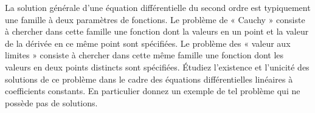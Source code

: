 
\begin{exercice}\label{exoEqsDiff0009}

La solution générale d'une équation différentielle du second ordre 
est typiquement une famille à deux paramètres de fonctions. Le 
problème de « Cauchy » consiste à chercher dans cette famille une 
fonction dont la valeurs en un point et la valeur de la dérivée en ce 
même point sont spécifiées. Le problème des « valeur aux limites »
consiste à chercher dans cette même famille une fonction dont les 
valeurs en deux points distincts sont spécifiées. Étudiez l'existence 
et l'unicité des solutions de ce problème dans le cadre des équations 
différentielles linéaires à coefficients constants. En particulier 
donnez un exemple de tel problème qui ne possède pas de solutions.

\end{exercice}
